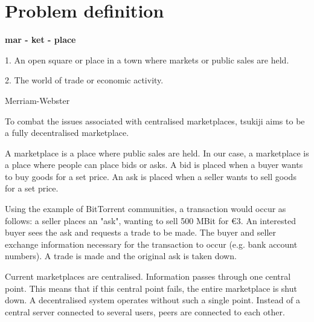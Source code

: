 \section{Problem definition}
\epigraph{\textbf{mar - ket - place}

1. An open square or place in a town where markets or public sales are held.

2. The world of trade or economic activity.}{Merriam-Webster}

To combat the issues associated with centralised marketplaces, tsukiji aims to be a fully decentralised marketplace.

A marketplace is a place where public sales are held.
In our case, a marketplace is a place where people can place bids or asks.
A bid is placed when a buyer wants to buy goods for a set price.
An ask is placed when a seller wants to sell goods for a set price.

Using the example of BitTorrent communities, a transaction would occur as follows: a seller places an "ask", wanting to sell 500 MBit for €3.
An interested buyer sees the ask and requests a trade to be made.
The buyer and seller exchange information necessary for the transaction to occur (e.g. bank account numbers).
A trade is made and the original ask is taken down.

Current marketplaces are centralised.
Information passes through one central point.
This means that if this central point fails, the entire marketplace is shut down.
A decentralised system operates without such a single point.
Instead of a central server connected to several users, peers are connected to each other.